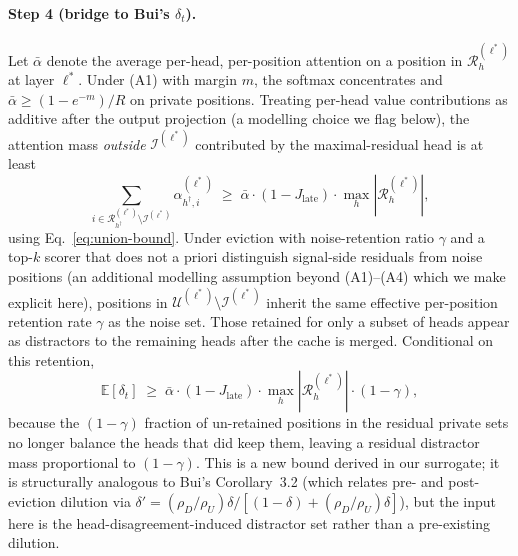 \documentclass{article}
\begin{document}
\paragraph{Step 4 (bridge to Bui's $\delta_t$).}
Let $\bar\alpha$ denote the average per-head, per-position attention on a
position in $\mathcal{R}^{(\ell^*)}_h$ at layer $\ell^*$. Under (A1)
with margin $m$, the softmax concentrates and $\bar\alpha \geq
(1 - e^{-m})/R$ on private positions. Treating per-head value
contributions as additive after the output projection (a modelling
choice we flag below), the attention mass \emph{outside}
$\mathcal{I}^{(\ell^*)}$ contributed by the maximal-residual head is at
least
\begin{equation}
\sum_{i \in \mathcal{R}^{(\ell^*)}_{h^\dagger} \setminus
\mathcal{I}^{(\ell^*)}} \alpha^{(\ell^*)}_{h^\dagger, i}
\;\geq\;
\bar\alpha \cdot (1 - J_{\text{late}}) \cdot \max_h
|\mathcal{R}^{(\ell^*)}_h|,
\end{equation}
using Eq.~\eqref{eq:union-bound}. Under eviction with noise-retention
ratio $\gamma$ and a top-$k$ scorer that does not a priori distinguish
signal-side residuals from noise positions (an additional modelling
assumption beyond (A1)--(A4) which we make explicit here), positions in
$\mathcal{U}^{(\ell^*)} \setminus \mathcal{I}^{(\ell^*)}$ inherit the
same effective per-position retention rate $\gamma$ as the noise set.
Those retained for only a subset of heads appear as distractors to the
remaining heads after the cache is merged. Conditional on this
retention,
\begin{equation}
\label{eq:Edelta-lb}
\mathbb{E}[\delta_t]
\;\geq\;
\bar\alpha \cdot (1 - J_{\text{late}}) \cdot
\max_h |\mathcal{R}^{(\ell^*)}_h|
\cdot (1 - \gamma),
\end{equation}
because the $(1 - \gamma)$ fraction of un-retained positions in the
residual private sets no longer balance the heads that did keep them,
leaving a residual distractor mass proportional to $(1 - \gamma)$. This
is a new bound derived in our surrogate; it is structurally analogous
to Bui's Corollary~3.2 (which relates pre- and post-eviction dilution
via $\delta' = (\rho_D/\rho_U)\delta / [(1 - \delta) +
(\rho_D/\rho_U)\delta]$), but the input here is the
head-disagreement-induced distractor set rather than a pre-existing
dilution.
\end{document}
